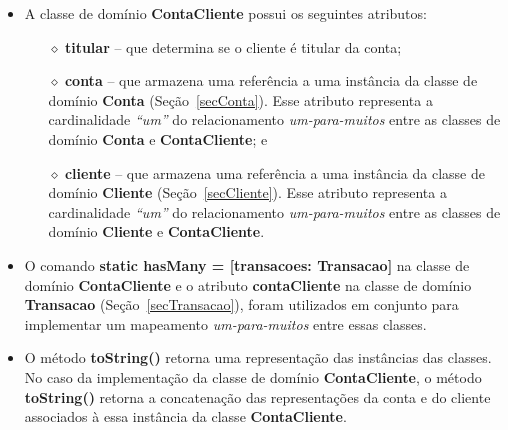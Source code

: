 \begin{itemize}

\item A classe de domínio {\bf ContaCliente} possui os seguintes atributos:

\vspace{0.5cm}

\begin{itemize}

\item[$\diamond$]  {\bf titular}  -- que  determina se  o cliente  é  titular da
  conta; 

\vspace{0.5cm}

\item[$\diamond$] {\bf conta} -- que  armazena uma referência a uma instância da
  classe   de  domínio  {\bf   Conta}  (Seção~\ref{secConta}).    Esse  atributo
  representa a cardinalidade {\em ``um''} do relacionamento {\em um-para-muitos}
  entre as classes de domínio {\bf Conta} e {\bf ContaCliente}; e

\vspace{0.5cm}

\item[$\diamond$] {\bf cliente}  -- que armazena uma referência  a uma instância
  da classe  de domínio  {\bf Cliente} (Seção~\ref{secCliente}).   Esse atributo
  representa a cardinalidade {\em ``um''} do relacionamento {\em um-para-muitos}
  entre as classes de domínio {\bf Cliente} e {\bf ContaCliente}.

\end{itemize}

\vspace{0.5cm}

\item  O comando {\bf  static hasMany  = [transacoes:  Transacao]} na  classe de
  domínio  {\bf ContaCliente}  e  o  atributo {\bf  contaCliente}  na classe  de
  domínio  {\bf  Transacao}   (Seção~\ref{secTransacao}),  foram  utilizados  em
  conjunto  para  implementar um  mapeamento  {\em  um-para-muitos} entre  essas
  classes.

\vspace{0.5cm}

\item O  método {\bf  toString()} retorna uma  representação das  instâncias das
  classes.  No caso da implementação  da classe de domínio {\bf ContaCliente}, o
  método {\bf toString()}  retorna a concatenação das representações  da conta e
  do cliente associados à essa instância da classe {\bf ContaCliente}.

\end{itemize}

